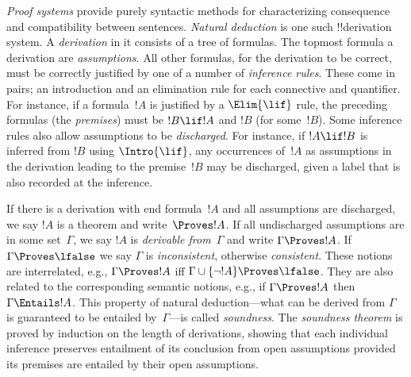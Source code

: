 \emph{Proof systems} provide purely syntactic methods for
characterizing consequence and compatibility between sentences.
\emph{Natural deduction} is one such !!{derivation} system. A \emph{derivation}
in it consists of a tree of formulas. The topmost formula a derivation
are \emph{assumptions}. All other formulas, for the derivation to be
correct, must be correctly justified by one of a number of
\emph{inference rules}. These come in pairs; an introduction and an
elimination rule for each connective and quantifier. For instance, if
a formula~$!A$ is justified by a $\Elim{\lif}$ rule, the preceding
formulas (the \emph{premises}) must be $!B \lif !A$ and $!B$ (for
some~$!B$). Some inference rules also allow assumptions to be
\emph{discharged}. For instance, if $!A \lif !B$ is inferred from $!B$
using $\Intro{\lif}$, any occurrences of~$!A$ as assumptions in the
derivation leading to the premise~$!B$ may be discharged, given a
label that is also recorded at the inference.

If there is a derivation with end formula~$!A$ and all assumptions are
discharged, we say $!A$ is a theorem and write~$\Proves !A$. If all
undischarged assumptions are in some set~$\Gamma$, we say $!A$ is
\emph{derivable from}~$\Gamma$ and write $\Gamma \Proves !A$. If
$\Gamma \Proves \lfalse$ we say $\Gamma$ is \emph{inconsistent},
otherwise \emph{consistent}. These notions are interrelated, e.g.,
$\Gamma \Proves !A$ iff $\Gamma \cup \{\lnot !A\} \Proves
\lfalse$. They are also related to the corresponding semantic notions,
e.g., if $\Gamma \Proves !A$ then $\Gamma \Entails !A$. This property
of natural deduction---what can be derived from $\Gamma$ is guaranteed
to be entailed by~$\Gamma$---is called \emph{soundness}. The
\emph{soundness theorem} is proved by induction on the length of
derivations, showing that each individual inference preserves
entailment of its conclusion from open assumptions provided its premises are
entailed by their open assumptions.

